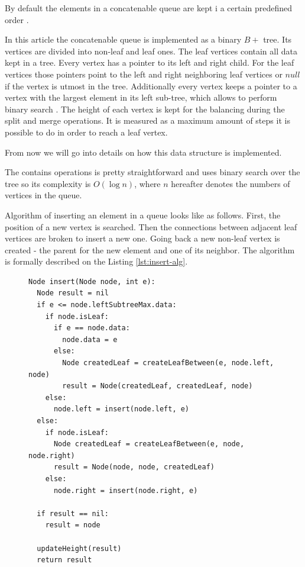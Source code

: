 \documentclass[sigconf]{acmart}
\begin{document}
		By default the elements in a concatenable queue are kept i a certain predefined order \cite[pp..~155-157]{aho}.
		
		In this article the concatenable queue is implemented as a binary  $B+$ tree. Its vertices are divided into non-leaf and leaf ones. The leaf vertices contain all data kept in a tree. Every vertex has a pointer to its left and right child. For the leaf vertices those pointers point to the left and right neighboring leaf vertices or $null$ if the vertex is utmost in the tree. 
		Additionally every vertex keeps a pointer to a vertex with the largest element in its left sub-tree, which  allows to perform binary search \cite[pp..~155-157]{aho}. The height of each vertex is kept for the balancing during the split and merge operations. It is measured as a maximum amount of steps it is possible to do in order to reach a leaf vertex.
		
		From now we will go into details on how this data structure is implemented. 
		
		The contains operations is pretty straightforward and uses binary search over the tree so its complexity is $O(\log n)$, where $n$ hereafter denotes the numbers of vertices in the queue.
		
		Algorithm of inserting an element in a queue looks like as follows. First, the position of a new vertex is searched. Then the connections between adjacent leaf vertices are broken to insert a new one. Going back a new non-leaf vertex is created - the parent for the new element and one of its neighbor. The algorithm is formally described on the Listing \ref{lst:insert-alg}.
		
		\begin{figure}[htbp]
			\begin{lstlisting}[caption={Queue insertion algorithm},label={lst:insert-alg},captionpos=b]
Node insert(Node node, int e):
  Node result = nil
  if e <= node.leftSubtreeMax.data: 
  	if node.isLeaf:
  	  if e == node.data:
        node.data = e
  	  else:
        Node createdLeaf = createLeafBetween(e, node.left, node)
        result = Node(createdLeaf, createdLeaf, node)
    else:
      node.left = insert(node.left, e)
  else:
    if node.isLeaf: 
      Node createdLeaf = createLeafBetween(e, node, node.right)
      result = Node(node, node, createdLeaf)
    else: 
      node.right = insert(node.right, e)
  
  if result == nil:
  	result = node
  	
  updateHeight(result)
  return result
			\end{lstlisting}
		\end{figure}
		
\end{document}
